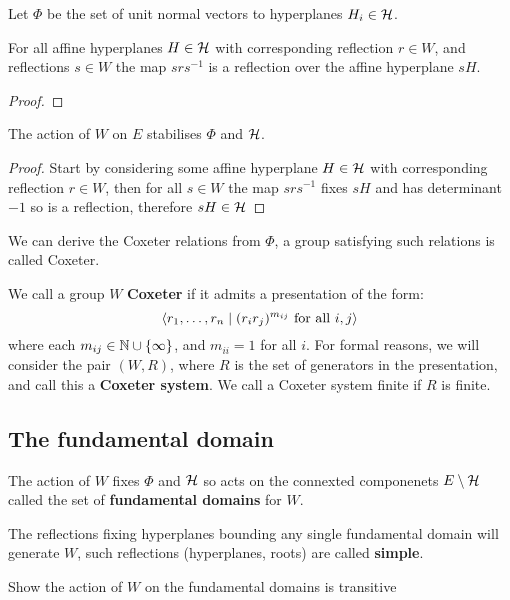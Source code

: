 \documentclass[../main.tex]{subfiles}
\begin{document}
Let $\Phi$ be the set of unit normal vectors to hyperplanes $H_i\in\mathcal{H}$.

\begin{lemma}
    For all affine hyperplanes $H\in\mathcal{H}$ with corresponding reflection $r\in W$, and reflections $s\in W$ the map $srs^{-1}$ is a reflection over the affine hyperplane $sH$.\begin{proof}
        
    \end{proof}
\end{lemma}

\begin{proposition}
    The action of $W$ on $E$ stabilises $\Phi$ and $\mathcal{H}$.
    \begin{proof}
        Start by considering some affine hyperplane $H\in\mathcal{H}$ with corresponding reflection $r\in W$, then for all $s\in W$ the map $srs^{-1}$ fixes $sH$ and has determinant $-1$ so is a reflection, therefore $sH\in\mathcal{H}$ 
    \end{proof}
\end{proposition}

We can derive the Coxeter relations from $\Phi$, a group satisfying such relations is called Coxeter.

\begin{definition}
    We call a group $W$ \textbf{Coxeter} if it admits a presentation of the form:\[
    \left\langle r_1,\ldots,r_n \mid (r_ir_j)^{m_{ij}}\text{ for all }i,j \right\rangle
    \]
    where each $m_{ij}\in \mathbb{N}\cup\{\infty\}$, and $m_{ii}=1$ for all $i$. For formal reasons, we will consider the pair $(W,R)$, where $R$ is the set of generators in the presentation, and call this a \textbf{Coxeter system}. We call a Coxeter system finite if $R$ is finite.
\end{definition}

\subsection{The fundamental domain}

The action of $W$ fixes $\Phi$ and $\mathcal{H}$ so acts on the connexted componenets $E\setminus\mathcal{H}$ called the set of \textbf{fundamental domains} for $W$. 

The reflections fixing hyperplanes bounding any single fundamental domain will generate $W$, such reflections (hyperplanes, roots) are called \textbf{simple}.

Show the action of $W$ on the fundamental domains is transitive
\end{document}
